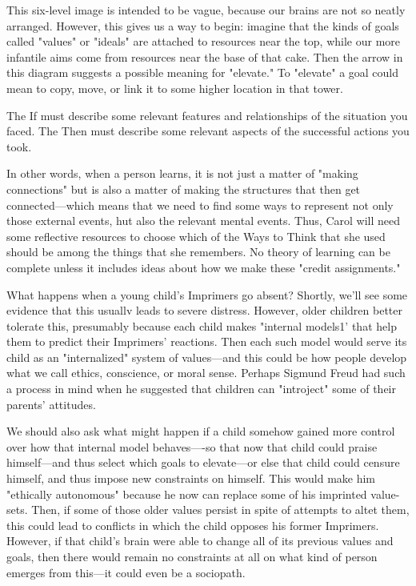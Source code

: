 \documentclass[10pt,a4paper]{article}
\begin{document}
This six-level image is intended to be vague, because our brains are not so neatly arranged. However, this gives us a way to begin: imagine that the kinds of goals called "values" or "ideals" are attached to resources near the top, while our more infantile aims come from resources near the base of that cake. Then the arrow in this diagram suggests a possible meaning for "elevate." To "elevate" a goal could mean to copy, move, or link it to some higher location in that tower. \cite[p.~47]{minsky}

The If must describe some relevant features and relationships of
the situation you faced.
The Then must describe some relevant aspects of the successful
actions you took. \cite[p.~49]{minsky}

In other words, when a person learns, it is not just a matter of "making connections" but is also a matter of making the structures that then get connected—which means that we need to find some ways to represent not only those external events, hut also the relevant mental events. Thus, Carol will need some reflective resources to choose which of the Ways to Think that she used should be among the things that she remembers. No theory of learning can be complete unless it includes ideas about how we make these "credit assignments." \cite[p.~49]{minsky}

What happens when a young child's Imprimers go absent? Shortly, we'll see some evidence that this usuallv leads to severe distress. However, older children better tolerate this, presumably because each child makes "internal models1' that help them to predict their Imprimers' reactions. Then each such model would serve its child as an "internalized" system of values—and this could be how people develop what we call ethics, conscience, or moral sense. Perhaps Sigmund Freud had such a process in mind when he suggested that children can "introject" some of their parents' attitudes. \cite[p.~50]{minsky}

We should also ask what might happen if a child somehow gained more control over how that internal model behaves—-so that now that child could praise himself—and thus select which goals to elevate—or else that child could censure himself, and thus impose new constraints on himself. This would make him "ethically autonomous" because he now can replace some of his imprinted value-sets. Then, if some of those older values persist in spite of attempts to altet them, this could lead to conflicts in which the child opposes his former Imprimers. However, if that child's brain were able to change all of its previous values and goals, then there would remain no constraints at all on what kind of person emerges from this—it could even be a sociopath. \cite[p.~51]{minsky}
\end{document}
